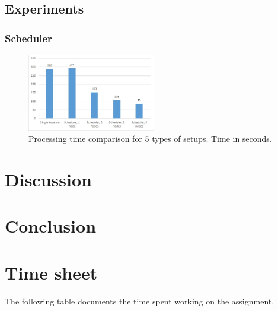 \documentclass{acm_proc_article-sp}
\begin{document}
\subsection{Experiments}

\subsubsection{Scheduler}
\begin{figure}[]
	\centering
	\includegraphics[width=0.5\textwidth]{images/diagram_total_processing.jpg}
	\caption{Processing time comparison for 5 types of setups. Time in seconds.}
	\label{fig:diagram_total_processing}
\end{figure}


\section{Discussion}
\label{sec_discussion}

\section{Conclusion}
\label{sec_conclusion}

{}


\appendix
\section{Time sheet}

The following table documents the time spent working on the assignment.
\end{document}
